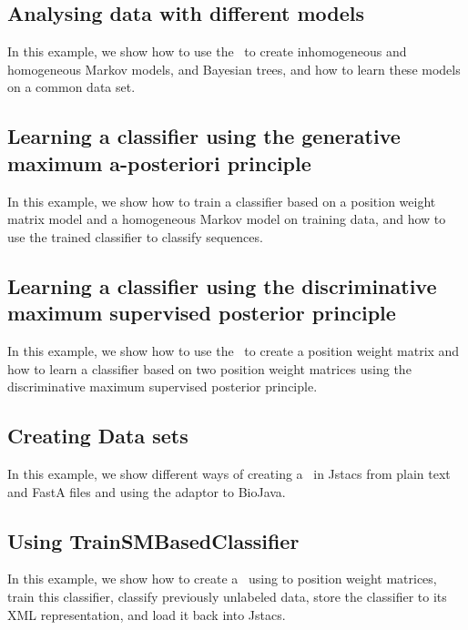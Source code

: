 \subsection{Analysing data with different models}
In this example, we show how to use the \TrainSMFactory~to create inhomogeneous and homogeneous Markov models, and Bayesian trees, and how to learn these models on a common data set.
\renewcommand{\codefile}{./recipes/AnalyseDataWithDifferentModels.java}
\setcounter{off}{35}

\subsection{Learning a classifier using the generative maximum a-posteriori principle}
In this example, we show how to train a classifier based on a position weight matrix model and a homogeneous Markov model on training data, and how to use the trained classifier to classify sequences.
\renewcommand{\codefile}{./recipes/TrainClassifier.java}
\setcounter{off}{40}

\subsection{Learning a classifier using the discriminative maximum supervised posterior principle}
In this example, we show how to use the \DiffSMFactory~to create a position weight matrix and how to learn a classifier based on two position weight matrices using the discriminative maximum supervised posterior principle.
\renewcommand{\codefile}{./recipes/CreateMSPClassifier.java}
\setcounter{off}{42}

\subsection{Creating Data sets}
In this example, we show different ways of creating a \DataSet~in Jstacs from plain text and FastA files and using the adaptor to BioJava.
\renewcommand{\codefile}{./recipes/DataLoader.java}
\setcounter{off}{42}

\subsection{Using TrainSMBasedClassifier}
In this example, we show how to create a \TrainSMBasedClassifier~using to position weight matrices, train this classifier, classify previously unlabeled data, store the classifier to its XML representation, and load it back into Jstacs.
\renewcommand{\codefile}{./recipes/TrainSMBasedClassifierTest.java}
\setcounter{off}{53}

